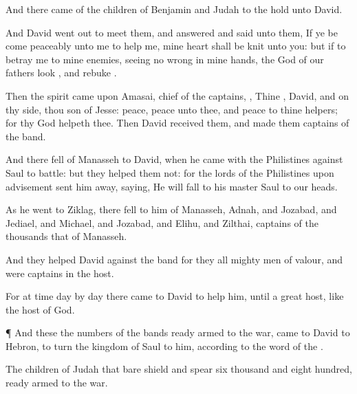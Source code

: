 {And there
came of the
children of
Benjamin and
Judah to the
hold unto
David.

And
David went
out to
meet them, and
answered and
said unto them, If ye be
come
peaceably unto me to
help me, mine
heart shall be
knit unto you: but if
{} to
betray me to mine
enemies, seeing
{}
no
wrong in mine
hands, the
God of our
fathers
look
{}, and
rebuke
{}.

Then the
spirit
came upon
Amasai,
{}
chief of the
captains,
{}, Thine
{},
David, and on thy side, thou
son of
Jesse:
peace,
peace
{} unto thee, and
peace
{} to thine
helpers; for thy
God
helpeth thee. Then
David
received them, and
made them
captains of the
band.

And there
fell
{} of
Manasseh to
David, when he
came with the
Philistines against
Saul to
battle: but they
helped them not: for the
lords of the
Philistines upon
advisement
sent him away,
saying, He will
fall to his
master
Saul to
{} our
heads.

As he
went to
Ziklag, there
fell to him of
Manasseh,
Adnah, and
Jozabad, and
Jediael, and
Michael, and
Jozabad, and
Elihu, and
Zilthai,
captains of the
thousands that
{} of
Manasseh.

And they
helped
David against the
band
{} for they
{} all mighty
men of
valour, and were
captains in the
host.

For at
{}
time
day by
day there
came to
David to
help him, until
{} a
great
host, like the
host of
God.


\par }{\PP {}¶ And these
{} the
numbers of the
bands
{} ready
armed to the
war,
{}
came to
David to
Hebron, to
turn the
kingdom of
Saul to him, according to the
word of the
{}.

The
children of
Judah that
bare
shield and
spear
{}
six
thousand and
eight
hundred, ready
armed to the
war.

}
